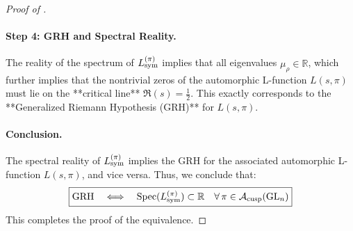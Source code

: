 \begin{proof}[Proof of ]
\paragraph{Step 4: GRH and Spectral Reality.}
The reality of the spectrum of \( L_{\mathrm{sym}}^{(\pi)} \) implies that all eigenvalues \( \mu_\rho \in \mathbb{R} \), which further implies that the nontrivial zeros of the automorphic L-function \( L(s, \pi) \) must lie on the **critical line** \( \Re(s) = \frac{1}{2} \). This exactly corresponds to the **Generalized Riemann Hypothesis (GRH)** for \( L(s, \pi) \).

\paragraph{Conclusion.}
The spectral reality of \( L_{\mathrm{sym}}^{(\pi)} \) implies the GRH for the associated automorphic L-function \( L(s, \pi) \), and vice versa. Thus, we conclude that:
\[
\boxed{
\text{GRH} \quad \Longleftrightarrow \quad \operatorname{Spec}(L_{\mathrm{sym}}^{(\pi)}) \subset \mathbb{R} \quad \forall \, \pi \in \mathcal{A}_{\text{cusp}}(\mathrm{GL}_n)
}
\]
This completes the proof of the equivalence.
\end{proof}
